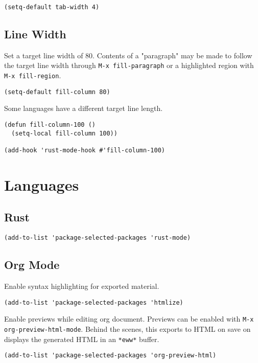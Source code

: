 \documentclass[11pt]{article}
\begin{document}
\begin{verbatim}
(setq-default tab-width 4)
\end{verbatim}
\subsection{Line Width}
\label{sec:org4e8035d}

Set a target line width of 80. Contents of a "paragraph" may be made to follow
the target line width through \texttt{M-x fill-paragraph} or a highlighted region with
\texttt{M-x fill-region}.

\begin{verbatim}
(setq-default fill-column 80)
\end{verbatim}

Some languages have a different target line length.

\begin{verbatim}
(defun fill-column-100 ()
  (setq-local fill-column 100))

(add-hook 'rust-mode-hook #'fill-column-100)
\end{verbatim}
\section{Languages}
\label{sec:org5a8c681}

\subsection{Rust}
\label{sec:org16dbc73}

\begin{verbatim}
(add-to-list 'package-selected-packages 'rust-mode)
\end{verbatim}
\subsection{Org Mode}
\label{sec:org50c7c89}

Enable syntax highlighting for exported material.

\begin{verbatim}
(add-to-list 'package-selected-packages 'htmlize)
\end{verbatim}

Enable previews while editing org document. Previews can be enabled with \texttt{M-x
org-preview-html-mode}. Behind the scenes, this exports to HTML on save on
displays the generated HTML in an \texttt{*eww*} buffer.

\begin{verbatim}
(add-to-list 'package-selected-packages 'org-preview-html)
\end{verbatim}
\end{document}
